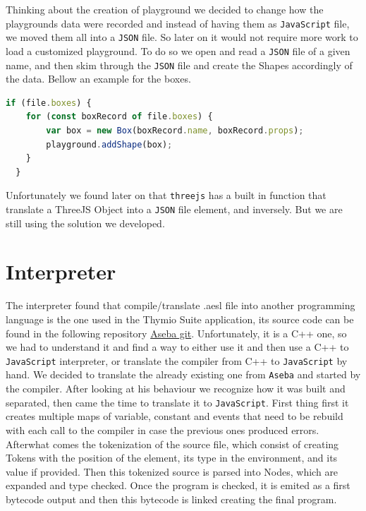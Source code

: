 \documentclass{scrbook}
\begin{document}
Thinking about the creation of playground we decided to change how the playgrounds data were recorded and instead of having them as \texttt{JavaScript} file, we moved them all into a \texttt{JSON} file. So later on it would not require more work to load a 
customized playground. To do so we open and read a \texttt{JSON} file of a given name, and then skim through the \texttt{JSON} file and create the Shapes accordingly of the data. Bellow an example for the boxes.
\begin{lstlisting}[language=JavaScript, basicstyle=\ttfamily\small]
  if (file.boxes) {
    for (const boxRecord of file.boxes) {
        var box = new Box(boxRecord.name, boxRecord.props);
        playground.addShape(box);
    }
  }
\end{lstlisting} 

Unfortunately we found later on that \texttt{threejs} has a built in function that translate a ThreeJS Object into a \texttt{JSON} file element, and inversely. But we are still using the solution we developed.

\section{Interpreter}
The interpreter found that compile/translate .aesl file into another programming language is the one used in the Thymio Suite application, its source code can be found in the following repository \href{https://github.com/aseba-community/aseba/tree/master/aseba/compiler}{Aseba git}.
Unfortunately, it is a C++ one, so we had to understand it and find a way to either use it and then use a C++ to \texttt{JavaScript} interpreter, or translate the compiler from C++ to \texttt{JavaScript} by hand.
We decided to translate the already existing one from \texttt{Aseba} and started by the compiler. After looking at his behaviour we recognize how it was built and separated,
then came the time to translate it to \texttt{JavaScript}. First thing first it creates multiple maps of variable, constant and events that need to be rebuild with each call to the compiler in case the previous ones produced errors.
Afterwhat comes the tokenization of the source file, which consist of creating Tokens with the position of the element, its type in the environment, and its value if provided. Then this tokenized source is parsed into Nodes, 
which are expanded and type checked. Once the program is checked, it is emited as a first bytecode output and then this bytecode is linked creating the final program.
\end{document}
